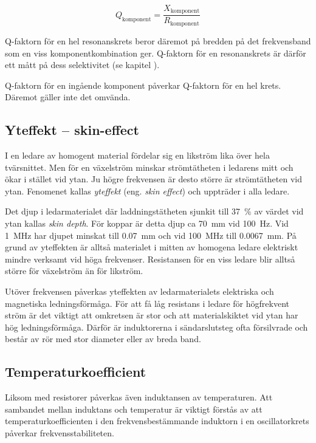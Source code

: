 \[Q_{\text{komponent}} = \dfrac{X_{\text{komponent}}}{R_{\text{komponent}}}\]

Q-faktorn för en hel resonanskrets beror däremot på bredden på det
frekvensband som en viss komponentkombination ger.
Q-faktorn för en resonanskrets är därför ett mått på dess
selektivitet (se kapitel ).

Q-faktorn för en ingående komponent påverkar Q-faktorn för en hel krets.
Däremot gäller inte det omvända.

\subsection{Yteffekt -- skin-effect}

I en ledare av homogent material fördelar sig en likström lika över hela
tvärsnittet. Men för en växelström minskar strömtätheten i ledarens mitt
och ökar i stället vid ytan.
Ju högre frekvensen är desto större är strömtätheten vid ytan.
Fenomenet kallas \emph{yteffekt} (eng. \emph{skin effect}) och uppträder i alla
ledare.

Det djup i ledarmaterialet där laddningstätheten sjunkit till \qty{37}{\percent}
av värdet vid ytan kallas \emph{skin depth}.
För koppar är detta djup ca \qty{70}{\milli\metre} vid \qty{100}{\hertz}.
Vid \qty{1}{\mega\hertz} har djupet minskat till \qty{0,07}{\milli\metre} och vid
\qty{100}{\mega\hertz} till \qty{0,0067}{\milli\metre}.
På grund av yteffekten är alltså materialet i mitten av homogena
ledare elektriskt mindre verksamt vid höga frekvenser. Resistansen för en viss ledare 
blir alltså större för växelström än för likström.

Utöver frekvensen påverkas yteffekten av ledarmaterialets elektriska och
magnetiska ledningsförmåga. För att få låg resistans i ledare för högfrekvent
ström är det viktigt att omkretsen är stor och att materialskiktet vid ytan har
hög ledningsförmåga. Därför är induktorerna i sändarslutsteg ofta 
försilvrade och består av rör med stor diameter eller av breda band.

\subsection{Temperaturkoefficient}

Liksom med resistorer påverkas även induktansen av temperaturen. Att sambandet
mellan induktans och temperatur är viktigt förstås av att
temperaturkoefficienten i den frekvensbestämmande induktorn i en oscillatorkrets
påverkar frekvensstabiliteten.

